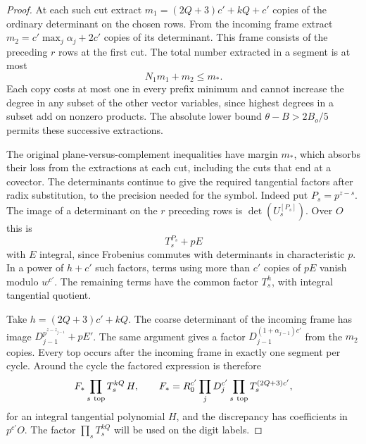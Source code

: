 \begin{proof}
At each such cut extract \(m_1=(2Q+3)c'+kQ+c'\) copies of the
ordinary determinant on the chosen rows. From the incoming frame
extract \(m_2=c'\max_j\alpha_j+2c'\) copies of its determinant.
This frame consists of the preceding \(r\) rows at the first cut.
The total number extracted in a segment is at most
\[
 N_1m_1+m_2\le m_*.
\]
Each copy costs at most one in every
prefix minimum and cannot increase the degree in any subset of
the other vector variables, since highest degrees in a subset
add on nonzero products. The absolute lower bound
\(\theta-B>2B_o/5\) permits these successive extractions.

The
original plane-versus-complement inequalities have margin
\(m_*\), which absorbs their loss from the extractions at each cut,
including the cuts that end at a covector.
The determinants continue to give the required tangential
factors after radix substitution, to the precision needed for
the symbol. Indeed put \(P_s=p^{z-s}\). The image of a
determinant on the \(r\) preceding rows is \(\det(U_s^{[P_s]})\).
Over \(O\) this is
\[
 T_s^{P_s}+pE
\]
with \(E\) integral,
since Frobenius commutes with determinants in characteristic
\(p\). In a power of \(h+c'\) such factors, terms using more
than \(c'\) copies of \(pE\) vanish modulo \(w^{c'}\).
The remaining terms have the common factor \(T_s^h\), with
integral tangential quotient.

Take \(h=(2Q+3)c'+kQ\).
The coarse determinant of the incoming frame has image
\(D_{j-1}^{p^{z-z_{j-1}}}+pE'\). The same argument gives a
factor \(D_{j-1}^{(1+\alpha_{j-1})c'}\) from the \(m_2\) copies.
Every top occurs after the incoming frame in exactly one segment
per cycle. Around the cycle the factored expression is therefore
\[
 F_*\prod_{s\ {\rm top}}T_s^{kQ}\,H,\qquad
 F_* = R_0^{c'}\prod_jD_j^{c'}
                 \prod_{s\ {\rm top}} T_s^{(2Q+3)c'},
\]
for an integral tangential polynomial \(H\), and the discrepancy
has coefficients in \(p^{c'}O\).  The factor \(\prod_s T_s^{kQ}\) will be used
on the digit labels.

\end{proof}









